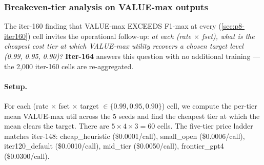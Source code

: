 %

\subsubsection{Breakeven-tier analysis on VALUE-max outputs}
\label{sec:p8-iter164-breakeven}

The iter-160 finding that VALUE-max EXCEEDS F1-max at every
(\ref{sec:p8-iter160}) cell invites the operational follow-up: \emph{at
each (rate $\times$ fset), what is the cheapest cost tier at which
VALUE-max utility recovers a chosen target level (0.99, 0.95, 0.90)?}
\textbf{Iter-164} answers this question with no additional training — the
2{,}000 iter-160 cells are re-aggregated.

\paragraph{Setup.}
For each (rate $\times$ fset $\times$ target $\in \{0.99, 0.95, 0.90\}$) cell,
we compute the per-tier mean VALUE-max util across the 5 seeds and find
the cheapest tier at which the mean clears the target. There are
$5 \times 4 \times 3 = 60$ cells. The five-tier price ladder matches
iter-148: cheap\_heuristic (\$0.0001/call), small\_open (\$0.0006/call),
iter120\_default (\$0.0010/call), mid\_tier (\$0.0050/call),
frontier\_gpt4 (\$0.0300/call).

